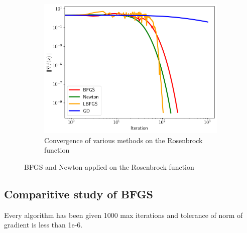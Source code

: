 \documentclass[12pt]{report}
\begin{document}
\begin{figure}[htpb]
\begin{subfigure}[t]{0.4\textwidth}
	\end{subfigure}
	\begin{subfigure}[t]{0.4\textwidth}
		\centering
		\includegraphics[width=\textwidth]{figs/rosenbrock_grad_norm_convergence.png}
		\caption{Convergence of various methods on the Rosenbrock function}
	\end{subfigure}
	\caption{BFGS and Newton applied on the Rosenbrock function}
\end{figure}
\subsection{Comparitive study of BFGS}
Every algorithm has been given 1000 max iterations and tolerance of norm of gradient is less than 1e-6.
\end{document}
